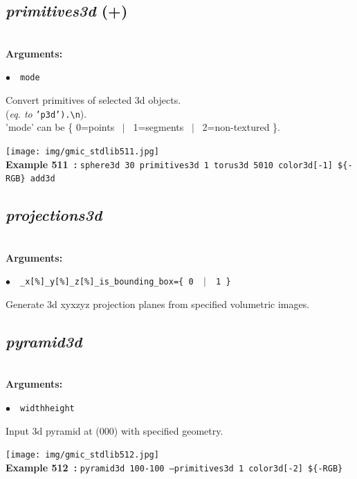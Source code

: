 \documentclass[a4paper,10.5pt,twoside]{book}
\def\comma{\discretionary{,}{}{,}}
\newcommand{\Cb}[1]{\textcolor{cb}{#1}}
\begin{document}
\subsection{\emph{primitives3d} (+)}\vspace*{-0.7em}
~\\\textbf{\Cb{Arguments: }}\begin{flushleft}
{\small \Cb{\hspace*{0.5cm}$\bullet$~~\texttt{mode}}}\end{flushleft}
Convert primitives of selected 3d objects.
~\\(\emph{eq. to} {\small \texttt{'p3d').\textbackslash n}}).
~\\'mode' can be \{ 0=points ~$|$~ 1=segments ~$|$~ 2=non-textured \}.
\begin{center}\texttt{[image: img/gmic\_stdlib511.jpg]}\\
{\footnotesize \textbf{Example 511~:} \texttt{sphere3d 30 primitives3d 1 torus3d 50{\comma}10 color3d[-1] \$\{-RGB\} add3d}}
\end{center}

\subsection{\emph{projections3d} }\vspace*{-0.7em}
~\\\textbf{\Cb{Arguments: }}\begin{flushleft}
{\small \Cb{\hspace*{0.5cm}$\bullet$~~\texttt{\_x[\%]{\comma}\_y[\%]{\comma}\_z[\%]{\comma}\_is\_bounding\_box=\{ 0 ~$|$~ 1 \}}}}\end{flushleft}
Generate 3d xy{\comma}xz{\comma}yz projection planes from specified volumetric images.


\subsection{\emph{pyramid3d} }\vspace*{-0.7em}
~\\\textbf{\Cb{Arguments: }}\begin{flushleft}
{\small \Cb{\hspace*{0.5cm}$\bullet$~~\texttt{width{\comma}height}}}\end{flushleft}
Input 3d pyramid at (0{\comma}0{\comma}0){\comma} with specified geometry.
\begin{center}\texttt{[image: img/gmic\_stdlib512.jpg]}\\
{\footnotesize \textbf{Example 512~:} \texttt{pyramid3d 100{\comma}-100 --primitives3d 1 color3d[-2] \$\{-RGB\}}}
\end{center}
\end{document}
